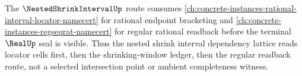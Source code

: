 The $\NestedShrinkIntervalUp$ route consumes \autoref{ch:concrete-instances-rational-interval-locator-namecert} for rational endpoint bracketing and \autoref{ch:concrete-instances-regseqrat-namecert} for regular rational readback before the terminal $\RealUp$ seal is visible. Thus the nested shrink interval dependency lattice reads locator cells first, then the shrinking-window ledger, then the regular readback route, not a selected intersection point or ambient completeness witness.
